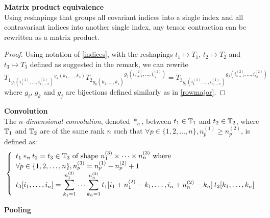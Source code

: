 \begin{remark}\textbf{Matrix product equivalence}\\
Using reshapings that groups all covariant indices into a single index and all contravariant indices into another single index, any tensor contraction can be rewritten as a matrix product.
\label{rq:matprodeq}
\end{remark}
\begin{proof}
Using notation of \eqref{indices}, with the reshapings $t_1 \mapsto T_1$, $t_2 \mapsto T_2$ and $t_3 \mapsto T_3$ defined as suggested in the remark, we can rewrite
$$
T_1 \hspace{0pt}_{g_i(i_1^{(1)}, \ldots, i_{r_1-s}^{(1)})} \hspace{0pt}^{g_k(k_1, \ldots, k_s)} 
T_2 \hspace{0pt}_{g_k(k_1^{\phantom{(}}, \ldots, k_s^{\phantom{(}})} \hspace{0pt}^{g_j(i_{s+1}^{(2)}, \ldots, i_{r_2}^{(2)})} =
T_3 \hspace{0pt}_ {g_i(i_1^{(1)}, \ldots, i_{r_1-s}^{(1)})} \hspace{0pt}^{g_j(i_{s+1}^{(2)}, \ldots, i_{r_2}^{(2)})}
$$
where $g_i$, $g_k$ and $g_j$ are bijections defined similarly as in \eqref{rowmajor}.
\end{proof}

\begin{definition}\textbf{Convolution}\\
The \emph{$n$-dimensional convolution}, denoted $\ast_n$, between $t_1 \in \mathbb{T}_1$ and $t_2 \in \mathbb{T}_2$, where $\mathbb{T}_1$ and $\mathbb{T}_2$ are of the same rank $n$ such that $\forall p \in \{1, 2, \ldots, n\}, n_p^{(1)} \ge n_p^{(2)}$, is defined as:
\begin{gather*}
\left\{
  \begin{array}{l}
    t_1 \ast_n t_2 = t_3 \in  \mathbb{T}_3 \text{ of shape } n_1^{(3)} \times \cdots \times n_n^{(3)}
    \text{ where} \\
    \forall p \in \{1, 2, \ldots, n\}, n_p^{(3)} = n_p^{(1)} - n_p^{(2)} + 1 \\
    t_3[i_1, \ldots, i_n] =
    \displaystyle \sum_{k_1=1}^{n_1^{(2)}} \cdots \sum_{k_n=1}^{n_n^{(2)}}
    t_1[i_1 + n_1^{(2)} - k_1, \ldots, i_n + n_n^{(2)} - k_n] \hspace{2pt} t_2[k_1, \ldots, k_n] \\
  \end{array}
\right.
\end{gather*}
\label{convdef}
\end{definition}

\begin{definition}\textbf{Pooling}\\


\end{definition}